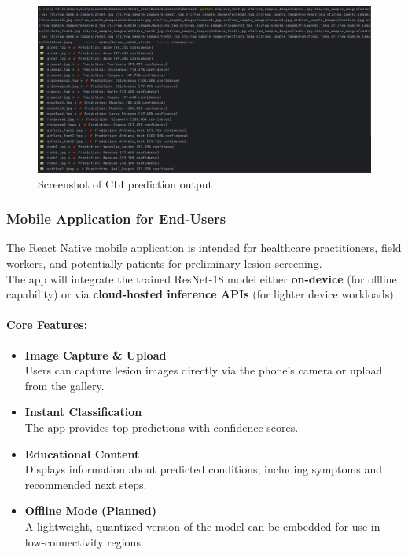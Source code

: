 \documentclass[
  12pt,
  oneside]{article}
\providecommand{\tightlist}{%
  \setlength{\itemsep}{0pt}\setlength{\parskip}{0pt}}
\begin{document}
\begin{figure}

{\centering \includegraphics[width=1\linewidth]{cli-prediction} 

}

\caption{Screenshot of CLI prediction output}\label{fig:unnamed-chunk-7}
\end{figure}

\newpage

\subsubsection{Mobile Application for
End-Users}\label{mobile-application-for-end-users}

The React Native mobile application is intended for healthcare
practitioners, field workers, and potentially patients for preliminary
lesion screening.\\
The app will integrate the trained ResNet-18 model either
\textbf{on-device} (for offline capability) or via \textbf{cloud-hosted
inference APIs} (for lighter device workloads).

\paragraph{Core Features:}\label{core-features}

\begin{itemize}
\tightlist
\item
  \textbf{Image Capture \& Upload}\\
  Users can capture lesion images directly via the phone's camera or
  upload from the gallery.
\item
  \textbf{Instant Classification}\\
  The app provides top predictions with confidence scores.
\item
  \textbf{Educational Content}\\
  Displays information about predicted conditions, including symptoms
  and recommended next steps.
\item
  \textbf{Offline Mode (Planned)}\\
  A lightweight, quantized version of the model can be embedded for use
  in low-connectivity regions.
\end{itemize}
\end{document}
